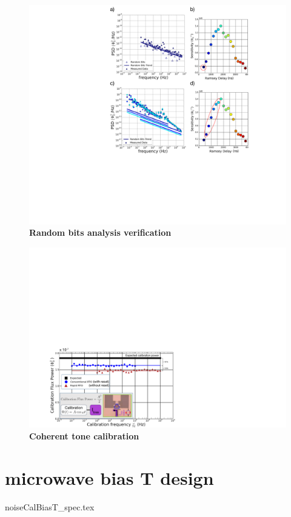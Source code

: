 \begin{figure}[h]
    \hspace{-65mm}
    \begin{center}
    \includegraphics[width=225mm]{./PDF/random_bits_191001_649p.pdf}
    \end{center}
    \caption{\textbf{Random bits analysis verification}
    }
    \label{random_bits_calibration}
\end{figure}

\begin{figure}[h]
    \begin{center}
        \includegraphics[width=300mm]{./PDF/coherent_tone_calibration_191001_650p.pdf}
    \end{center}
    \caption{\textbf{Coherent tone calibration}}
    \label{coherent_tone_calibration}
\end{figure}

\section{microwave bias T design}

{noiseCalBiasT_spec.tex}


